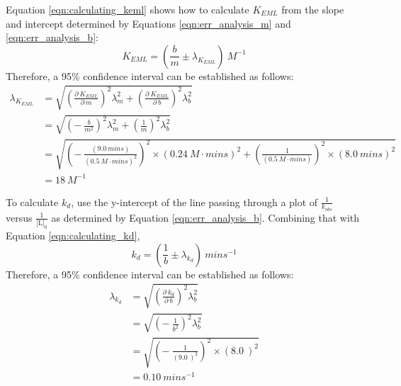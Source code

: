 Equation \eqref{eqn:calculating_keml} shows how to calculate $K_{EML}$ from the slope and intercept determined by Equations \eqref{eqn:err_analysis_m} and \eqref{eqn:err_analysis_b}:
\begin{equation*}
K_{EML}=\left (\frac{b}{m}\pm\lambda_{K_{EML}}\right ){\ }M^{-1}
\end{equation*}
Therefore, a 95\% confidence interval can be established as follows:
\begin{equation*}
\begin{split}
\lambda_{K_{EML}}&=\sqrt{\left (\frac{\partial{\ }K_{EML}}{\partial{\ }m}\right )^{2}\lambda_{m}^{2}+\left (\frac{\partial{\ }K_{EML}}{\partial{\ }b}\right )^{2}\lambda_{b}^{2}} \\
&=\sqrt{\left (-{\ }\frac{b}{m^{2}}\right )^{2}\lambda_{m}^{2}+\left (\frac{1}{m}\right )^{2}\lambda_{b}^{2}} \\
&=\sqrt{\left (-{\ }\frac{\left (9.0{\ }mins\right )}{\left (0.5{\ }M\cdot{mins}\right )^{2}}\right )^2\times\left (0.24{\ }M\cdot{mins}\right )^2+\left (\frac{1}{\left (0.5{\ }M\cdot{mins}\right )}\right )^2\times\left (8.0{\ }mins\right )^2} \\
&=18\ M^{-1}
\end{split}
\end{equation*}

To calculate $k_d$, use the y-intercept of the line passing through a plot of $\frac{1}{k_{obs}}$ versus $\frac{1}{\text{[L]}_0}$ as determined by Equation \eqref{eqn:err_analysis_b}. Combining that with Equation \eqref{eqn:calculating_kd},
\begin{equation*}
k_{d}=\left (\frac{1}{b}\pm\lambda_{k_{d}}\right ){\ }mins^{-1}
\end{equation*}
Therefore, a 95\% confidence interval can be established as follows:
\begin{equation*}
\begin{split}
\lambda_{k_{d}}&=\sqrt{\left (\frac{\partial{\ }k_{d}}{\partial{\ }b}\right )^{2}\lambda_{b}^{2}}\\
&=\sqrt{\left (-{\ }\frac{1}{b^{2}}\right )^{2}\lambda_{b}^{2}}\\
&=\sqrt{\left (-{\ }\frac{1}{\left (9.0{\ }\right )^{2}}\right )^2\times\left (8.0{\ }\right )^2}\\
&=0.10\ mins^{-1}
\end{split}
\end{equation*}

